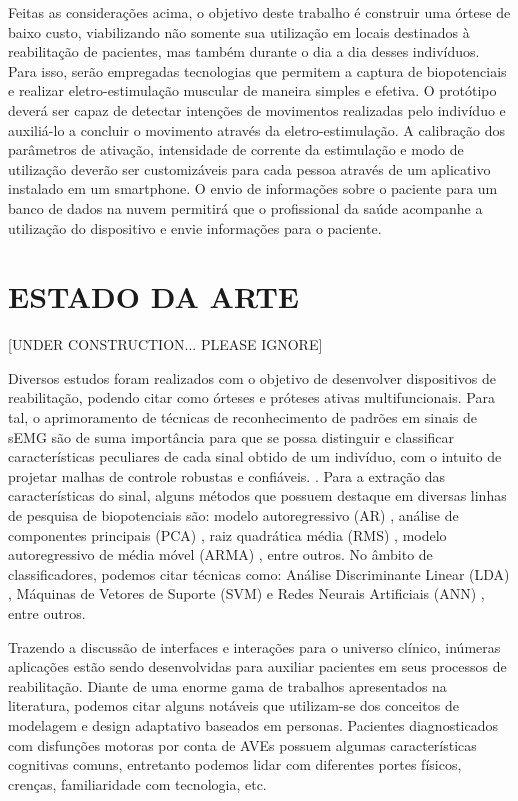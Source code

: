\documentclass[rascunho,xindy]{fei}
\begin{document}
Feitas as considerações acima, o objetivo deste trabalho é construir uma órtese de baixo custo, viabilizando não somente sua utilização em locais destinados à reabilitação de pacientes, mas também durante o dia a dia desses indivíduos. Para isso, serão empregadas tecnologias que permitem a captura de biopotenciais e realizar eletro-estimulação muscular de maneira simples e efetiva. O protótipo deverá ser capaz de detectar intenções de movimentos realizadas pelo indivíduo e auxiliá-lo a concluir o movimento através da eletro-estimulação. A calibração dos parâmetros de ativação, intensidade de corrente da estimulação e modo de utilização deverão ser customizáveis para cada pessoa através de um aplicativo instalado em um smartphone. O envio de informações sobre o paciente para um banco de dados na nuvem permitirá que o profissional da saúde acompanhe a utilização do dispositivo e envie informações para o paciente.



\chapter{ESTADO DA ARTE}

[UNDER CONSTRUCTION... PLEASE IGNORE]

Diversos estudos foram realizados com o objetivo de desenvolver dispositivos de reabilitação, podendo citar como órteses e próteses ativas multifuncionais. Para tal, o aprimoramento de técnicas de reconhecimento de padrões em sinais de sEMG são de suma importância para que se possa distinguir e classificar características peculiares de cada sinal obtido de um indivíduo, com o intuito de projetar malhas de controle robustas e confiáveis. \cite{graupe1982multifunctional}. Para a extração das características do sinal, alguns métodos que possuem destaque em  diversas linhas de pesquisa de biopotenciais são: modelo autoregressivo (AR) \cite{matrone2012real}, análise de componentes principais (PCA)  \cite{graupe1975functional}, raiz quadrática média (RMS) \cite{Shenoy2008}, modelo autoregressivo de média móvel (ARMA)  \cite{castro2014semg}, entre outros. 
No âmbito de classificadores, podemos citar técnicas como: Análise Discriminante Linear (LDA) \cite{young2013classification,tkach2010study}, Máquinas de Vetores de Suporte (SVM) \cite{lorrain2011influence,leon2011} e Redes Neurais Artificiais (ANN) \cite{amsuss2014self}, entre outros.

Trazendo a discussão de interfaces e interações para o universo clínico, inúmeras aplicações estão sendo desenvolvidas para auxiliar pacientes em seus processos de reabilitação. Diante de uma enorme gama de trabalhos apresentados na literatura, podemos citar alguns notáveis que utilizam-se dos conceitos de modelagem e design adaptativo baseados em personas. Pacientes diagnosticados com disfunções motoras por conta de AVEs possuem algumas características cognitivas comuns, entretanto podemos lidar com diferentes portes físicos, crenças, familiaridade com tecnologia, etc. 
\end{document}
